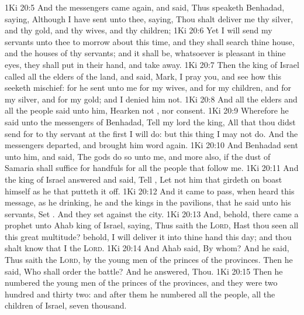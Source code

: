 \vs 1Ki 20:5 And the messengers came again, and said, Thus speaketh Benhadad, saying, Although I have sent unto thee, saying, Thou shalt deliver me thy silver, and thy gold, and thy wives, and thy children;
\vs 1Ki 20:6 Yet I will send my servants unto thee to morrow about this time, and they shall search thine house, and the houses of thy servants; and it shall be,  whatsoever is pleasant in thine eyes, they shall put  in their hand, and take  away.
\vs 1Ki 20:7 Then the king of Israel called all the elders of the land, and said, Mark, I pray you, and see how this  seeketh mischief: for he sent unto me for my wives, and for my children, and for my silver, and for my gold; and I denied him not.
\vs 1Ki 20:8 And all the elders and all the people said unto him, Hearken not , nor consent.
\vs 1Ki 20:9 Wherefore he said unto the messengers of Benhadad, Tell my lord the king, All that thou didst send for to thy servant at the first I will do: but this thing I may not do. And the messengers departed, and brought him word again.
\vs 1Ki 20:10 And Benhadad sent unto him, and said, The gods do so unto me, and more also, if the dust of Samaria shall suffice for handfuls for all the people that follow me.
\vs 1Ki 20:11 And the king of Israel answered and said, Tell , Let not him that girdeth on  boast himself as he that putteth it off.
\vs 1Ki 20:12 And it came to pass, when  heard this message, as he  drinking, he and the kings in the pavilions, that he said unto his servants, Set . And they set  against the city.
\vs 1Ki 20:13 And, behold, there came a prophet unto Ahab king of Israel, saying, Thus saith the \textsc{Lord}, Hast thou seen all this great multitude? behold, I will deliver it into thine hand this day; and thou shalt know that I  the \textsc{Lord}.
\vs 1Ki 20:14 And Ahab said, By whom? And he said, Thus saith the \textsc{Lord},  by the young men of the princes of the provinces. Then he said, Who shall order the battle? And he answered, Thou.
\vs 1Ki 20:15 Then he numbered the young men of the princes of the provinces, and they were two hundred and thirty two: and after them he numbered all the people,  all the children of Israel,  seven thousand.
